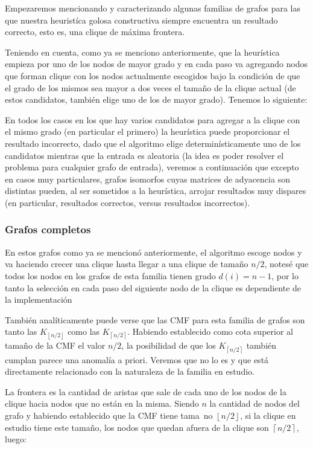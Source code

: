 Empezaremos mencionando y caracterizando algunas familias de grafos
para las que nuestra heurist\'ica golosa constructiva siempre encuentra
un resultado correcto, esto es, una clique de m\'axima frontera.

Teniendo en cuenta, como ya se menciono anteriormente, que la heur\'istica
empieza por uno de los nodos de mayor grado y en cada paso va 
agregando nodos que forman clique con los nodos actualmente escogidos
bajo la condici\'on de que el grado de los mismos sea mayor a dos veces
el tama\~no de la clique actual (de estos candidatos, tambi\'en elige
uno de los de mayor grado). Tenemos lo siguiente:

En todos los casos en los que hay varios candidatos para agregar a la
clique con el mismo grado (en particular el primero) la heur\'istica
puede proporcionar el resultado incorrecto, dado que el algoritmo
elige determin\'isticamente uno de los candidatos mientras que la 
entrada es aleatoria (la idea es poder resolver el problema para
cualquier grafo de entrada), veremos a continuaci\'on que excepto
en casos muy particulares, grafos isomorfos cuyas matrices de adyacencia
son distintas pueden, al ser sometidos a la heur\'istica, arrojar
resultados muy dispares (en particular, resultados correctos, versus
resultados incorrectos).

\subsubsection{Grafos completos}
	En estos grafos como ya se mencion\'o anteriormente, el algoritmo
	escoge nodos y va haciendo crecer una clique hasta llegar a una 
	clique de tama\~no $n/2$, notes\'e que todos los nodos en los 
	grafos de esta familia tienen grado $d(i) = n - 1$, por lo
	tanto la selecci\'on en cada paso del siguiente nodo de la
	clique es dependiente de la implementaci\'on

	Tambi\'en anal\'iticamente puede verse que las CMF para esta 
	familia de grafos son tanto las $K_{\left \lfloor{n/2}\right \rfloor}$ 
	como las $K_{\left \lceil{n/2}\right \rceil}$. Habiendo establecido como
	cota superior al tama\~no de la CMF el valor $n/2$, la posibilidad de que
	los $K_{\left \lceil{n/2}\right \rceil}$ tambi\'en cumplan parece una 
	anomal\'ia a priori. Veremos que no lo es y que est\'a directamente
	relacionado con la naturaleza de la familia en estudio. 

	La frontera es la cantidad de aristas que sale de cada uno de los
	nodos de la clique hacia nodos que no est\'an en la misma. Siendo
	$n$ la cantidad de nodos del grafo y habiendo establecido que la CMF
	tiene tama~no $\left \lfloor{n/2}\right \rfloor$, 
	si la clique en estudio tiene este tama\~no, los nodos que quedan afuera
	de la clique son $\left \lceil{n/2} \right \rceil$, luego: 

